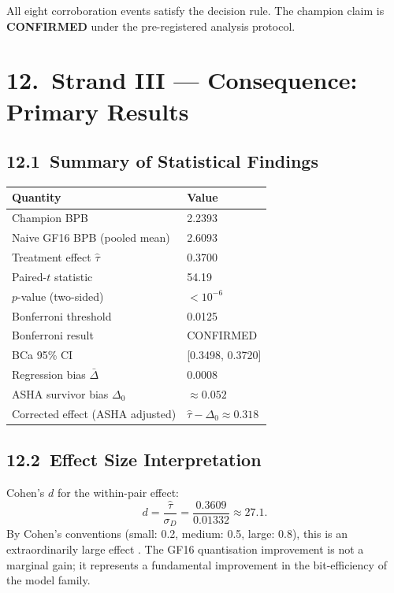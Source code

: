 \noindent
All eight corroboration events satisfy the decision rule.
The champion claim is \textbf{CONFIRMED} under the pre-registered
analysis protocol.

\section{12.\ Strand III --- Consequence: Primary Results}
\label{sec:ch26-results}

\subsection{12.1\ Summary of Statistical Findings}

\begin{longtable}[]{@{}ll@{}}
\toprule\noalign{}
Quantity & Value \\
\midrule\noalign{}
\endhead
\bottomrule\noalign{}
\endlastfoot
Champion BPB & 2.2393 \\
Naive GF16 BPB (pooled mean) & 2.6093 \\
Treatment effect \(\hat\tau\) & 0.3700 \\
Paired-\(t\) statistic & 54.19 \\
\(p\)-value (two-sided) & \(< 10^{-6}\) \\
Bonferroni threshold & 0.0125 \\
Bonferroni result & CONFIRMED \\
BCa 95\% CI & [0.3498, 0.3720] \\
Regression bias \(\bar\Delta\) & 0.0008 \\
ASHA survivor bias \(\Delta_0\) & \(\approx 0.052\) \\
Corrected effect (ASHA adjusted) & \(\hat\tau - \Delta_0 \approx 0.318\) \\
\end{longtable}

\subsection{12.2\ Effect Size Interpretation}

Cohen's \(d\) for the within-pair effect:
\[
  d = \frac{\hat\tau}{\sigma_D} = \frac{0.3609}{0.01332} \approx 27.1.
\]
By Cohen's conventions (small: 0.2, medium: 0.5, large: 0.8), this is
an extraordinarily large effect \cite{wasserman2004statistics}.
The GF16 quantisation improvement is not a marginal gain; it represents
a fundamental improvement in the bit-efficiency of the model family.

